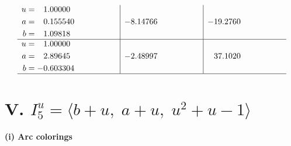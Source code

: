 \documentclass[1p]{elsarticle_modified}
\theoremstyle{definition}
\begin{document}
$$\begin{array}{c|c|c}
\begin{aligned}
u &= \phantom{-}1.00000\phantom{ +0.000000I} \\
a &= \phantom{-}0.155540\phantom{ +0.000000I} \\
b &= \phantom{-}1.09818\phantom{ +0.000000I}\end{aligned}
 & -8.14766\phantom{ +0.000000I} & -19.2760\phantom{ +0.000000I} \\ \hline\begin{aligned}
u &= \phantom{-}1.00000\phantom{ +0.000000I} \\
a &= \phantom{-}2.89645\phantom{ +0.000000I} \\
b &= -0.603304\phantom{ +0.000000I}\end{aligned}
 & -2.48997\phantom{ +0.000000I} & \phantom{-}37.1020\phantom{ +0.000000I}\\
 \hline 
 \end{array}$$\newpage\newpage\renewcommand{\arraystretch}{1}
\centering \section*{V. $I^u_{5}= \langle b+u,\;a+u,\;u^2+u-1 \rangle$}
\flushleft \textbf{(i) Arc colorings}\\
\end{document}
